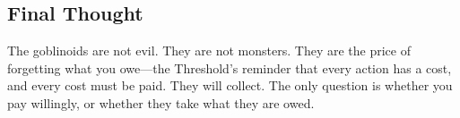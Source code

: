 \subsection{Final Thought}

The goblinoids are not evil. They are not monsters. They are the price of forgetting what you owe---the Threshold's reminder that every action has a cost, and every cost must be paid. They will collect. The only question is whether you pay willingly, or whether they take what they are owed.

